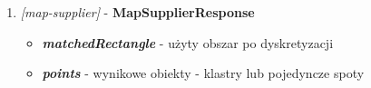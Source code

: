 \begin{enumerate}
    \item
    \Large\emph{[map-supplier]} - \textbf{MapSupplierResponse}\normalsize
    \begin{itemize}
        \item
        \textbf{\emph{matchedRectangle}} - użyty obszar po dyskretyzacji

        \item
        \textbf{\emph{points}} - wynikowe obiekty - klastry lub pojedyncze spoty

    \end{itemize} 
    


\end{enumerate}



